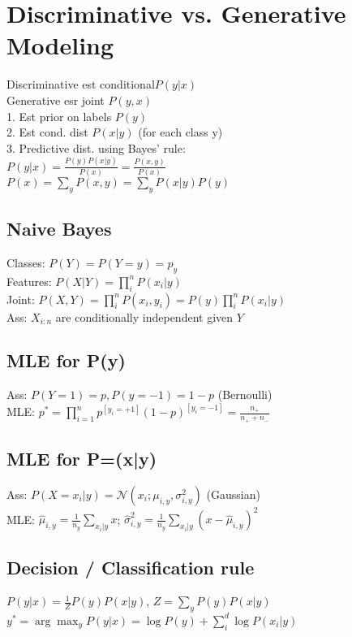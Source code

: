 \section*{\normalsize{Discriminative vs. Generative Modeling}}
Discriminative est conditional$P(y|x)$\\
Generative esr joint $P(y,x)$\\
1. Est prior on labels $P(y)$\\
2. Est cond. dist $P(x|y)$ (for each class y)\\
3. Predictive dist. using Bayes' rule:\\
$P(y|x) = \frac{P(y) P(x|y)}{P(x)} = \frac{P(x,y)}{P(x)}$\\
$P(x) = \sum_y P(x,y)=\sum_y P(x|y)P(y)$

\subsection*{Naive Bayes}
Classes: $P(Y)=P(Y=y)=p_y$\\
Features: $P(X|Y)=\prod_{i}^n P(x_i|y)$ \\
Joint: $P(X,Y) = \prod_i^n P(x_i,y_i)=P(y) \prod_i^n P(x_i|y)$ \\
Ass: $X_{i:n}$ are conditionally independent given $Y$

\subsection*{MLE for P(y)}
Ass: $P(Y=1) = p, P(y=-1) = 1-p$ (Bernoulli)\\
MLE: $p^* = \prod_{i=1}^n p^{[y_i=+1]} (1-p)^{[y_i=-1]}=\frac{n_+}{n_+ + n_-}$

\subsection*{MLE for P=(x|y)}
Ass: $P(X=x_i|y) = \mathcal{N}(x_i;\mu_{i,y}, \sigma_{i,y}^2)$ (Gaussian)\\
MLE: $\hat{\mu}_{i,y} = \frac{1}{n_y} \sum_{{x_i|y}} x$;  
$\hat{\sigma}_{i,y}^2 = \frac{1}{n_y} \sum_{{x_i|y}} (x-\hat{\mu}_{i,y})^2$

\subsection*{Decision / Classification rule}
$P(y|x) = \frac{1}{Z} P(y)P(x|y)$, $Z = \sum_y P(y) P(x|y)$\\
$y^*=\arg\max_{y}P(y|x)=\log P(y)+\sum_{i}^d\log P(x_i|y)$

